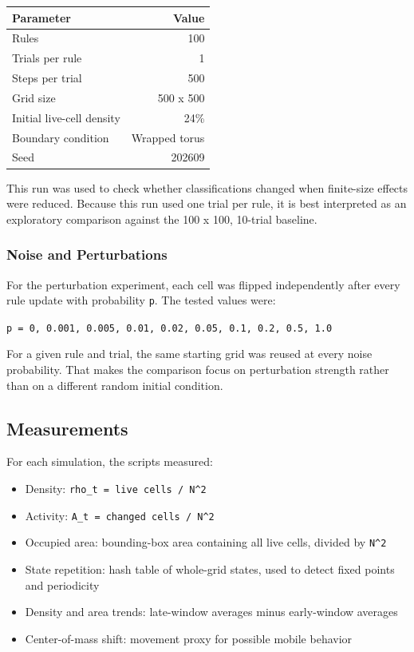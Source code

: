 \documentclass[
]{article}
\newcounter{none} %
\providecommand{\tightlist}{%
  \setlength{\itemsep}{0pt}\setlength{\parskip}{0pt}}
\begin{document}
{\def\LTcaptype{none} %
\begin{longtable}[]{@{}lr@{}}
\toprule\noalign{}
Parameter & Value \\
\midrule\noalign{}
\endhead
\bottomrule\noalign{}
\endlastfoot
Rules & 100 \\
Trials per rule & 1 \\
Steps per trial & 500 \\
Grid size & 500 x 500 \\
Initial live-cell density & 24\% \\
Boundary condition & Wrapped torus \\
Seed & 202609 \\
\end{longtable}
}

This run was used to check whether classifications changed when
finite-size effects were reduced. Because this run used one trial per
rule, it is best interpreted as an exploratory comparison against the
100 x 100, 10-trial baseline.

\subsubsection{Noise and Perturbations}\label{noise-and-perturbations}

For the perturbation experiment, each cell was flipped independently
after every rule update with probability \texttt{p}. The tested values
were:

\texttt{p\ =\ 0,\ 0.001,\ 0.005,\ 0.01,\ 0.02,\ 0.05,\ 0.1,\ 0.2,\ 0.5,\ 1.0}

For a given rule and trial, the same starting grid was reused at every
noise probability. That makes the comparison focus on perturbation
strength rather than on a different random initial condition.

\subsection{Measurements}\label{measurements}

For each simulation, the scripts measured:

\begin{itemize}
\tightlist
\item
  Density: \texttt{rho\_t\ =\ live\ cells\ /\ N\^{}2}
\item
  Activity: \texttt{A\_t\ =\ changed\ cells\ /\ N\^{}2}
\item
  Occupied area: bounding-box area containing all live cells, divided by
  \texttt{N\^{}2}
\item
  State repetition: hash table of whole-grid states, used to detect
  fixed points and periodicity
\item
  Density and area trends: late-window averages minus early-window
  averages
\item
  Center-of-mass shift: movement proxy for possible mobile behavior
\end{itemize}
\end{document}
